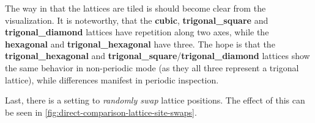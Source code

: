 The way in that the lattices are tiled is should become clear from the visualization.
It is noteworthy, that the \textbf{cubic}, \textbf{trigonal\_square} and \textbf{trigonal\_diamond} lattices have repetition along two axes, while the \textbf{hexagonal} and \textbf{trigonal\_hexagonal} have three. 
The hope is that the \textbf{trigonal\_hexagonal} and \textbf{trigonal\_square}/\textbf{trigonal\_diamond} lattices show the same behavior in non-periodic mode (as they all three represent a trigonal lattice), while differences manifest in periodic inspection.

Last, there is a setting to \emph{randomly swap} lattice positions. 
The effect of this can be seen in \autoref{fig:direct-comparison-lattice-site-swaps}.

\begin{figure}[htbp]
    \centering


\end{figure}
